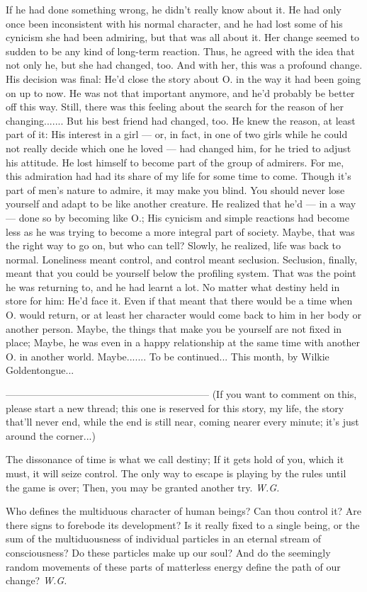 If he had done something wrong, he didn't really know about it. He had only once been inconsistent with his normal character, and he had lost some of his cynicism she had been admiring, but that was all about it. Her change seemed to sudden to be any kind of long-term reaction. 
Thus, he agreed with the idea that not only he, but she had changed, too. And with her, this was a profound change. 
His decision was final: He'd close the story about O. in the way it had been going on up to now. He was not that important anymore, and he'd probably be better off this way. Still, there was this feeling about the search for the reason of her changing....... 
But his best friend had changed, too. He knew the reason, at least part of it: His interest in a girl --- or, in fact, in one of two girls while he could not really decide which one he loved --- had changed him, for he tried to adjust his attitude. He lost himself to become part of the group of admirers. 
For me, this admiration had had its share of my life for some time to come. Though it's part of men's nature to admire, it may make you blind. You should never lose yourself and adapt to be like another creature. 
He realized that he'd --- in a way --- done so by becoming like O.; His cynicism and simple reactions had become less as he was trying to become a more integral part of society. Maybe, that was the right way to go on, but who can tell? 
Slowly, he realized, life was back to normal. Loneliness meant control, and control meant seclusion. Seclusion, finally, meant that you could be yourself below the profiling system. That was the point he was returning to, and he had learnt a lot. 
No matter what destiny held in store for him: He'd face it. Even if that meant that there would be a time when O. would return, or at least her character would come back to him in her body or another person. Maybe, the things that make you be yourself are not fixed in place; Maybe, he was even in a happy relationship at the same time with another O. in another world. 
Maybe.......
To be continued...
This month, by Wilkie Goldentongue...

--------------------------------------------------------------
(If you want to comment on this, please start a new thread; this one is reserved for this story, my life, the story that'll never end, while the end is still near, coming nearer every minute; it's just around the corner...)

The dissonance of time 
is what we call destiny; 
If it gets hold of you, 
which it must, 
it will seize control. 
The only way to escape 
is playing by the rules 
until the game is over; 
Then, you may be granted another try. 
\emph{W.G.}

Who defines the multiduous character 
of human beings? 
Can thou control it? 
Are there signs to forebode its development? 
Is it really fixed to a single being, 
or the sum of the multiduousness 
of individual particles 
in an eternal stream 
of consciousness? 
Do these particles 
make up our soul? 
And do the seemingly random movements 
of these parts of matterless energy 
define the path of our change? 
\emph{W.G.}
